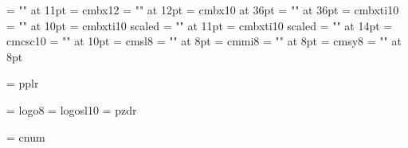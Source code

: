 \font\zhelevenbf = "\hei" at 11pt
\def\elevenbf{\enelevenbf\letfont\zhelevenbf}
\font\entwelvebf = cmbx12
\font\zhtwelvebf = "\hei" at 12pt
\def\twelvebf{\entwelvebf\letfont\zhtwelvebf}
\font\enthirtysixbf = cmbx10 at 36pt
\font\zhthirtysixbf = "\hei" at 36pt
\def\thirtysixbf{\enthirtysixbf\letfont\zhthirtysixbf}
%
\font\entenbi = cmbxti10
\font\zhtenbi = "\hei" at 10pt
\def\tenbi{\entenbi\letfont\zhtenbi}
\font\enelevenbi= cmbxti10 scaled \magstephalf
\font\zhelevenbi = "\hei" at 11pt
\def\elevenbi{\enelevenbi\letfont\zhelevenbi}
\font\enfourteenbi= cmbxti10 scaled 
\font\zhfourteenbi = "\hei" at 14pt
\def\fourteenbi{\enfourteenbi\letfont\zhfourteenbi}
%
\font\entensc = cmcsc10
\font\zhtensc = "\fang" at 10pt
\def\tensc{\entensc\letfont\zhtensc}
\font\eneightsl = cmsl8
\font\zheightsl = "\fang" at 8pt
\def\eightsl{\eneightsl\letfont\zheightsl}
\font\eneighti = cmmi8
\font\zheighti = "\kai" at 8pt
\def\eighti{\eneighti\letfont\zheighti}
\font\eneightsy = cmsy8
\font\zheightsy = "\song" at 8pt
\def\eightsy{\eneightsy\letfont\zheightsy}

 
%
\font\tenpal = pplr

% 
\font\eightlogo = logo8
\font\logosl = logosl10
\font\handfont = pzdr

\ifmsdos
   \font\cnum = cnum %
   \let\chapternumeralfont = \cnum
\fi

\def\undefinedfont{\errmessage{Undefined font}}

% 
\def\clearfonts{\let\rm = \undefinedfont \let\bf = \undefinedfont
   \let\it = \undefinedfont \let\bi = \undefinedfont
   \let\tt = \undefinedfont \let\bt = \undefinedfont
   \let\sc = \undefinedfont
   \let\ss = \undefinedfont
}

